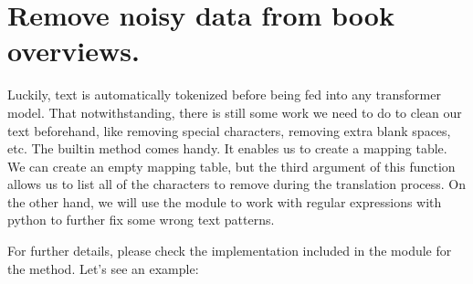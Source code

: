 \documentclass[letterpaper,10pt,english]{sphinxmanual}
\begin{document}
\section{Remove noisy data from book overviews.}
\label{\detokenize{Data preprocessing:Remove-noisy-data-from-book-overviews.}}
Luckily, text is automatically tokenized before being fed into any transformer model. That notwithstanding, there is still some work we need to do to clean our text beforehand, like removing special characters, removing extra blank spaces, etc. The  built\sphinxhyphen{}in method comes handy. It enables us to create a mapping table. We can create an empty mapping table, but the third argument of this function allows us to list all of the characters to remove during the translation process. On the
other hand, we will use the  module to work with regular expressions with python to further fix some wrong text patterns.

For further details, please check the implementation included in the  module for the  method. Let’s see an example:

{
\begin{sphinxVerbatim}[commandchars=\\\{\}]
\llap{\color{nbsphinxin}[22]:\,\hspace{\fboxrule}\hspace{\fboxsep}}  \PYG{p}{[}  \PYG{p}{]}\PYG{p}{[}\PYG{p}{]}
\end{sphinxVerbatim}
}
\end{document}
